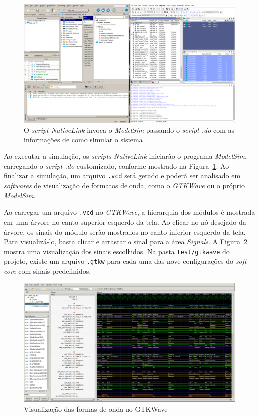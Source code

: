     \begin{figure}[H]
    \centering
        \includegraphics[width=.75\linewidth]{../images/quartus/quartus_modelsim.png}
        \caption{O \textit{script NativeLink} invoca o \textit{ModelSim} passando
            o \textit{script .do} com as informações de como simular o sistema}
        \label{fig:quartus_modelsim}
    \end{figure}

    { Ao executar a simulação, os \textit{scripts NativeLink} iniciarão o
        programa \textit{ModelSim}, carregando o \textit{script .do} customizado,
        conforme mostrado na Figura~\ref{fig:quartus_modelsim}. Ao finalizar a
        simulação, um arquivo \texttt{.vcd} será gerado e poderá ser analisado
        em \textit{softwares} de visualização de formatos de onda, como o
        \textit{GTKWave} ou o próprio \textit{ModelSim}.
    }

    { Ao carregar um arquivo \texttt{.vcd} no \textit{GTKWave}, a hierarquia
        dos módulos é mostrada em uma árvore no canto superior esquerdo da tela.
        Ao clicar no nó desejado da árvore, os sinais do módulo serão mostrados
        no canto inferior esquerdo da tela. Para visualizá-lo, basta clicar e
        arrastar o sinal para a área \textit{Signals}. A Figura~\ref{fig:gtkwave_generic}
        mostra uma visualização dos sinais escolhidos. Na pasta \texttt{test/gtkwave}
        do projeto, existe um arquivo \texttt{.gtkw} para cada uma das nove
        configurações do \textit{soft-core} com sinais predefinidos.
    }

    \begin{figure}[H]
    \centering
        \includegraphics[width=.9\linewidth]{../images/gtkwave/random.png}
        \caption{Visualização das formas de onda no GTKWave}
        \label{fig:gtkwave_generic}
    \end{figure}

